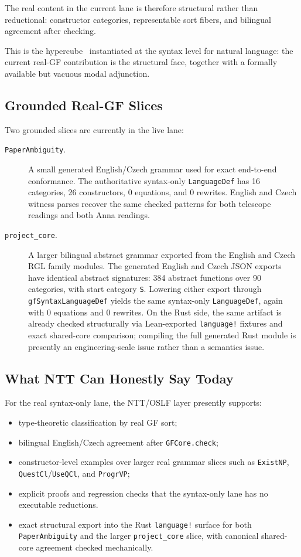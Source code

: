 \documentclass[]{article}
\newcommand{\code}[1]{\texttt{#1}}
\begin{document}
The real content in the current lane is therefore structural rather
than reductional: constructor categories, representable sort fibers,
and bilingual agreement after checking.

This is the hypercube~\cite{staymeredith2026hypercube} instantiated at
the syntax level for natural language: the current real-GF contribution
is the structural face, together with a formally available but vacuous
modal adjunction.

\subsection{Grounded Real-GF Slices}

Two grounded slices are currently in the live lane:

\begin{description}
\item[\code{PaperAmbiguity}.] A small generated English/Czech grammar used
  for exact end-to-end conformance.  The authoritative syntax-only
  \code{LanguageDef} has 16 categories, 26 constructors, 0 equations,
  and 0 rewrites.  English and Czech witness parses recover the same
  checked patterns for both telescope readings and both Anna readings.

\item[\code{project\_core}.] A larger bilingual abstract grammar exported
  from the English and Czech RGL family modules.  The generated English
  and Czech JSON exports have identical abstract signatures: 384 abstract
  functions over 90 categories, with start category \code{S}.  Lowering
  either export through \code{gfSyntaxLanguageDef} yields the same
  syntax-only \code{LanguageDef}, again with 0 equations and 0 rewrites.
  On the Rust side, the same artifact is already checked structurally via
  Lean-exported \code{language!} fixtures and exact shared-core comparison;
  compiling the full generated Rust module is presently an engineering-scale
  issue rather than a semantics issue.
\end{description}

\subsection{What NTT Can Honestly Say Today}

For the real syntax-only lane, the NTT/OSLF layer presently supports:
\begin{itemize}
\item type-theoretic classification by real GF sort;
\item bilingual English/Czech agreement after \code{GFCore.check};
\item constructor-level examples over larger real grammar slices such as
  \code{ExistNP}, \code{QuestCl}/\code{UseQCl}, and \code{ProgrVP};
\item explicit proofs and regression checks that the syntax-only lane
  has no executable reductions.
\item exact structural export into the Rust \code{language!} surface for both
  \code{PaperAmbiguity} and the larger \code{project\_core} slice, with
  canonical shared-core agreement checked mechanically.
\end{itemize}
\end{document}
